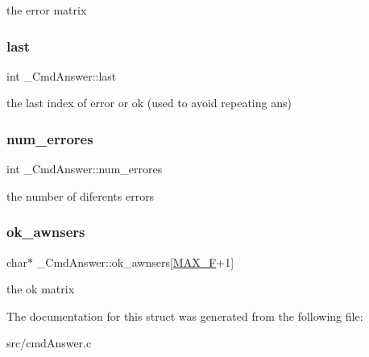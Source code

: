 the error matrix \mbox{\label{struct__CmdAnswer_a1e4af9c26d5974297fe891f6c5400f0d}} 
\subsubsection{\texorpdfstring{last}{last}}
{\footnotesize\ttfamily int \+\_\+\+Cmd\+Answer\+::last}

the last index of error or ok (used to avoid repeating ans) \mbox{\label{struct__CmdAnswer_a5d8d0bc22a3af9deea5c77b3b8d95a9c}} 
\subsubsection{\texorpdfstring{num\+\_\+errores}{num\_errores}}
{\footnotesize\ttfamily int \+\_\+\+Cmd\+Answer\+::num\+\_\+errores}

the number of diferents errors \mbox{\label{struct__CmdAnswer_ae721fdb2efdf0882e2fdacf74451c77b}} 
\subsubsection{\texorpdfstring{ok\+\_\+awnsers}{ok\_awnsers}}
{\footnotesize\ttfamily char$\ast$ \+\_\+\+Cmd\+Answer\+::ok\+\_\+awnsers\mbox{[}\hyperlink{cmdAnswer_8h_a4cbdbe9b7f8e2757f49434127d9f1cb3}{M\+A\+X\+\_\+F}+1\mbox{]}}

the ok matrix 

The documentation for this struct was generated from the following file\+:\begin{DoxyCompactItemize}
\item 
src/cmd\+Answer.\+c\end{DoxyCompactItemize}
